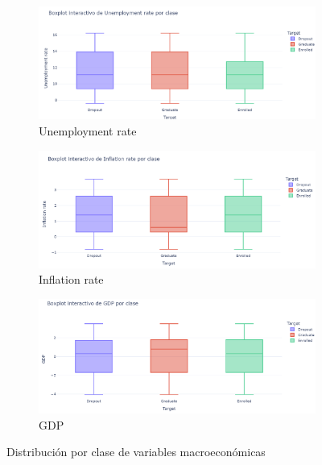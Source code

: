 \documentclass{report}[14pt]
\begin{document}
\begin{figure}[H]
    \centering
    \begin{subfigure}[b]{0.32\textwidth}
        \includegraphics[width=\textwidth]{distribution_plotly/unemployment_rate.png}
        \caption{Unemployment rate}
    \end{subfigure}
    \hfill
    \begin{subfigure}[b]{0.32\textwidth}
        \includegraphics[width=\textwidth]{distribution_plotly/inflation_rate.png}
        \caption{Inflation rate}
    \end{subfigure}
    \hfill
    \begin{subfigure}[b]{0.32\textwidth}
        \includegraphics[width=\textwidth]{distribution_plotly/gdp.png}
        \caption{GDP}
    \end{subfigure}
    \caption{Distribución por clase de variables macroeconómicas}
    \label{fig:macroeconomicas}
\end{figure}
\end{document}
